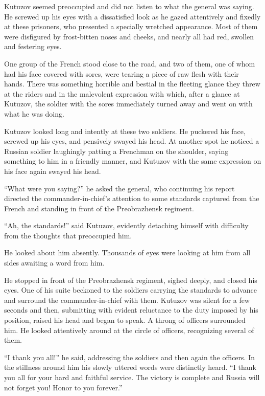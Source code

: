 Kutuzov seemed preoccupied and did not listen to what the general
was saying. He screwed up his eyes with a dissatisfied look as he
gazed attentively and fixedly at these prisoners, who presented a
specially wretched appearance. Most of them were disfigured by
frost-bitten noses and cheeks, and nearly all had red, swollen
and festering eyes.

One group of the French stood close to the road, and two of them,
one of whom had his face covered with sores, were tearing a piece
of raw flesh with their hands. There was something horrible and
bestial in the fleeting glance they threw at the riders and in
the malevolent expression with which, after a glance at Kutuzov,
the soldier with the sores immediately turned away and went on
with what he was doing.

Kutuzov looked long and intently at these two soldiers. He
puckered his face, screwed up his eyes, and pensively swayed his
head. At another spot he noticed a Russian soldier laughingly
patting a Frenchman on the shoulder, saying something to him in a
friendly manner, and Kutuzov with the same expression on his face
again swayed his head.

``What were you saying?'' he asked the general, who continuing
his report directed the commander-in-chief's attention to some
standards captured from the French and standing in front of the
Preobrazhensk regiment.

``Ah, the standards!'' said Kutuzov, evidently detaching himself
with difficulty from the thoughts that preoccupied him.

He looked about him absently. Thousands of eyes were looking at
him from all sides awaiting a word from him.

He stopped in front of the Preobrazhensk regiment, sighed deeply,
and closed his eyes. One of his suite beckoned to the soldiers
carrying the standards to advance and surround the
commander-in-chief with them.  Kutuzov was silent for a few
seconds and then, submitting with evident reluctance to the duty
imposed by his position, raised his head and began to speak. A
throng of officers surrounded him. He looked attentively around
at the circle of officers, recognizing several of them.

``I thank you all!'' he said, addressing the soldiers and then
again the officers. In the stillness around him his slowly
uttered words were distinctly heard. ``I thank you all for your
hard and faithful service.  The victory is complete and Russia
will not forget you! Honor to you forever.''

